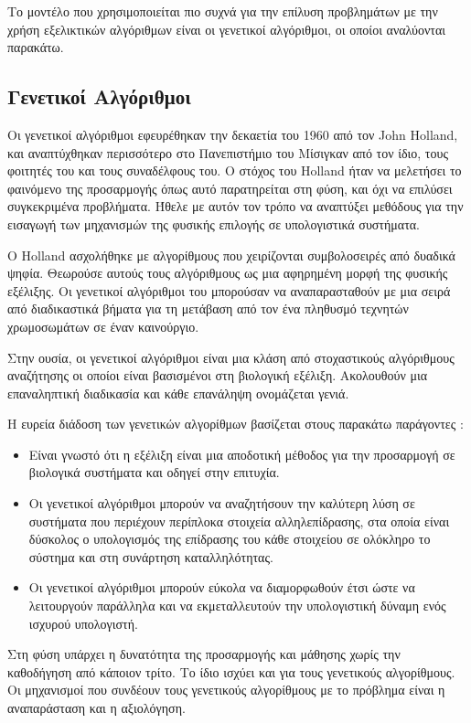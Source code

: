 Το μοντέλο που χρησιμοποιείται πιο συχνά για την επίλυση προβλημάτων με την χρήση εξελικτικών αλγόριθμων είναι οι γενετικοί αλγόριθμοι, οι οποίοι αναλύονται παρακάτω.

\subsection{Γενετικοί Αλγόριθμοι}

Οι γενετικοί αλγόριθμοι εφευρέθηκαν την δεκαετία του 1960 από τον John Holland, και αναπτύχθηκαν περισσότερο στο Πανεπιστήμιο του Μίσιγκαν από τον ίδιο, τους φοιτητές του και τους συναδέλφους του. Ο στόχος του Holland ήταν να μελετήσει το φαινόμενο της προσαρμογής όπως αυτό παρατηρείται στη φύση, και όχι να επιλύσει συγκεκριμένα προβλήματα. Ήθελε με αυτόν τον τρόπο να αναπτύξει μεθόδους για την εισαγωγή των μηχανισμών της φυσικής επιλογής σε υπολογιστικά συστήματα. \cite{Melanie1999}

O Holland ασχολήθηκε με αλγορίθμους που χειρίζονται συμβολοσειρές από δυαδικά ψηφία. Θεωρούσε αυτούς τους αλγόριθμους ως μια αφηρημένη μορφή της φυσικής εξέλιξης. Οι γενετικοί αλγόριθμοι του μπορούσαν να αναπαρασταθούν με μια σειρά από διαδικαστικά βήματα για τη μετάβαση από τον ένα πληθυσμό τεχνητών χρωμοσωμάτων σε έναν καινούργιο. \cite{Negnevitsky2005}

Στην ουσία, οι γενετικοί αλγόριθμοι είναι μια κλάση από στοχαστικούς αλγόριθμους αναζήτησης οι οποίοι είναι βασισμένοι στη βιολογική εξέλιξη. Ακολουθούν μια επαναληπτική διαδικασία και κάθε επανάληψη ονομάζεται γενιά.

Η ευρεία διάδοση των γενετικών αλγορίθμων βασίζεται στους παρακάτω παράγοντες \cite{Mitchell1997} :
\begin{itemize}
  \item Είναι γνωστό ότι η εξέλιξη είναι μια αποδοτική μέθοδος για την προσαρμογή σε βιολογικά συστήματα και οδηγεί στην επιτυχία.
  \item Οι γενετικοί αλγόριθμοι μπορούν να αναζητήσουν την καλύτερη λύση σε συστήματα που περιέχουν περίπλοκα στοιχεία αλληλεπίδρασης, στα οποία είναι δύσκολος ο υπολογισμός της επίδρασης του κάθε στοιχείου σε ολόκληρο το σύστημα και στη συνάρτηση καταλληλότητας.
  \item Οι γενετικοί αλγόριθμοι μπορούν εύκολα να διαμορφωθούν έτσι ώστε να λειτουργούν παράλληλα και να εκμεταλλευτούν την υπολογιστική δύναμη ενός ισχυρού υπολογιστή.
\end{itemize}

Στη φύση υπάρχει η δυνατότητα της προσαρμογής και μάθησης χωρίς την καθοδήγηση από κάποιον τρίτο. Το ίδιο ισχύει και για τους γενετικούς αλγορίθμους. Οι μηχανισμοί που συνδέουν τους γενετικούς αλγορίθμους με το πρόβλημα είναι η αναπαράσταση και η αξιολόγηση.

